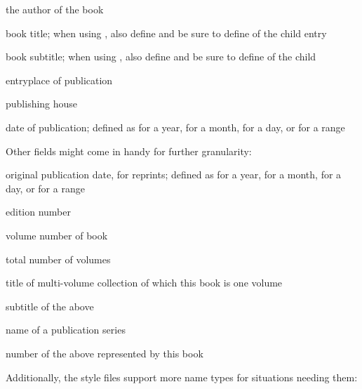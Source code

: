 \documentclass{ltxdockit}[2011/03/25]
\newenvironment*{optionslistNOT}
  {\list{}{%
     \setlength{\labelwidth}{\marglistwidth}%
     \setlength{\labelsep}{\marglistsep}%
     \setlength{\leftmargin}{50pt}%
     \renewcommand*{\makelabel}[1]{\hss\marglistfont##1}}%
   \def\optionitem##1{%
     \item[{\textbf{##1}}]}}
  {\endlist}
\begin{document}
\begin{optionslistNOT}
	\optionitem{author}
	the author of the book

	\optionitem{title}
	book title; when using , also define  and be sure to define  of the child entry

	\optionitem{subtitle}
	book subtitle; when using , also define  and be sure to define  of the child

	\optionitem{location}
	entryplace of publication

	\optionitem{publisher}
	publishing house

	\optionitem{date}
	date of publication; defined as  for a year,  for a month,  for a day, or  for a range
\end{optionslistNOT}

Other fields might come in handy for further granularity:

\begin{optionslistNOT}
	\optionitem{origdate}
	original publication date, for reprints; defined as  for a year,  for a month,  for a day, or  for a range

	\optionitem{edition}
	edition number

	\optionitem{volume}
	volume number of book

	\optionitem{volumes}
	total number of volumes

	\optionitem{maintitle}
	title of multi-volume collection of which this book is one volume

	\optionitem{mainsubtitle}
	subtitle of the above 

	\optionitem{series}
	name of a publication series

	\optionitem{number}
	number of the above  represented by this book

\end{optionslistNOT}

Additionally, the style files support more name types for situations needing them:
\end{document}
